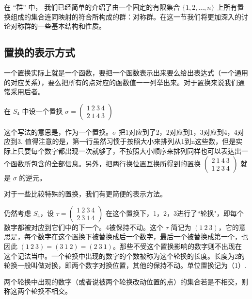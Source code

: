 

在 “群” 中， 我们已经简单的介绍了由一个固定的有限集合 $\{1, 2, ..., n\}$ 上所有置换组成的集合连同映射的符合所构成的群：对称群。在这一节我们将更加深入的讨论对称群的一些基本结构和性质。

\subsection{置换的表示方式}
一个置换实际上就是一个函数，要把一个函数表示出来要么给出表达式（一个通用的对应关系），要么把所有的点对应的函数值一一列举出来。对于置换来说我们通常采用后者。
\begin{example}{}
在 $S_4$ 中设一个置换 $\sigma=\begin{pmatrix}
1\ 2\ 3\ 4\\ 2\ 1\ 4\ 3
\end{pmatrix}$
\end{example}
这个写法的意思是，作为一个置换。$\sigma$ 把$1$对应到了2，2对应到1，3对应到4，4对应到3. 值得注意的是，第一行虽然习惯于按照大小来排列从1到n这些数，但是实际上只要每个数字都出现一次就够了，不按照大小顺序来排列同样也可以表达出一个函数所包含的全部信息。另外，把两行换位置互换所得到的置换
$\begin{pmatrix}
2\ 1\ 4\ 3\\ 1\ 2\ 3\ 4
\end{pmatrix}$
就是 $\sigma$ 的逆元。


对于一些比较特殊的置换，我们有更简便的表示方法。
\begin{example}{}
仍然考虑 $S_4$，设 $\tau=\begin{pmatrix}
1\ 2\ 3\ 4\\ 2\ 3\ 1\ 4
\end{pmatrix}$ 在这个置换下，1，2，3进行了“轮换"，即每个数字都被对应到它们中的下一个。4被保持不动。这个 $\tau$ 简记为 $(1\ 2\ 3)$，它的意思是，每个数字在这个置换下被替换成后一个数字，最后一个被替换成第一个，也因此 $(1\ 2\ 3)=(3\ 1\ 2)=(2\ 3\ 1)$。那些不受这个置换影响的数字则不出现在这个记法当中。一个轮换中出现的数字的个数被称为这个轮换的长度。长度为2的轮换一般叫做对换，即两个数字对换位置，其他的保持不动。单位置换记为（1）.
\end{example}

\begin{definition}{}
两个轮换中出现的数字（或者说被两个轮换改动位置的点）的集合若是不相交，则称这两个轮换不相交。
\end{definition}

